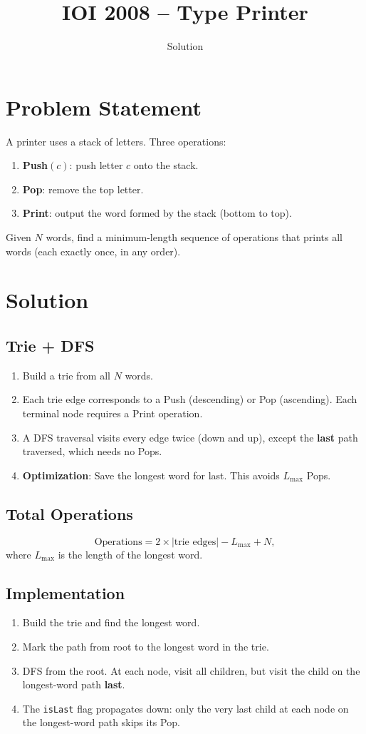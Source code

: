 \documentclass[11pt,a4paper]{article}
\title{IOI 2008 -- Type Printer}
\author{Solution}
\date{}
\begin{document}
\maketitle

\section{Problem Statement}
A printer uses a stack of letters. Three operations:
\begin{enumerate}
    \item \textbf{Push}$(c)$: push letter $c$ onto the stack.
    \item \textbf{Pop}: remove the top letter.
    \item \textbf{Print}: output the word formed by the stack (bottom to top).
\end{enumerate}
Given $N$ words, find a minimum-length sequence of operations that prints all words (each exactly once, in any order).

\section{Solution}

\subsection{Trie + DFS}
\begin{enumerate}
    \item Build a trie from all $N$ words.
    \item Each trie edge corresponds to a Push (descending) or Pop (ascending). Each terminal node requires a Print operation.
    \item A DFS traversal visits every edge twice (down and up), except the \textbf{last} path traversed, which needs no Pops.
    \item \textbf{Optimization}: Save the longest word for last. This avoids $L_{\max}$ Pops.
\end{enumerate}

\subsection{Total Operations}
\[
\text{Operations} = 2 \times |\text{trie edges}| - L_{\max} + N,
\]
where $L_{\max}$ is the length of the longest word.

\subsection{Implementation}
\begin{enumerate}
    \item Build the trie and find the longest word.
    \item Mark the path from root to the longest word in the trie.
    \item DFS from the root. At each node, visit all children, but visit the child on the longest-word path \textbf{last}.
    \item The \texttt{isLast} flag propagates down: only the very last child at each node on the longest-word path skips its Pop.
\end{enumerate}
\end{document}
